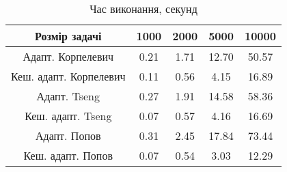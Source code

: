 \begin{table}[H]
	\centering
	\begin{tabular}{|c||c|c|c|c|}\hline
		Розмір задачі & 1000 & 2000 & 5000 & 10000 \\ \hline \hline
		Адапт. Корпелевич & 0.21 & 1.71 & 12.70 & 50.57 \\ \hline
		Кеш. адапт. Корпелевич & 0.11 & 0.56 & 4.15 & 16.89 \\ \hline
		Адапт. Tseng & 0.27 & 1.91 & 14.58 & 58.36 \\ \hline
		Кеш. адапт. Tseng & 0.07 & 0.57 & 4.16 & 16.69 \\ \hline
		Адапт. Попов & 0.31 & 2.45 & 17.84 & 73.44 \\ \hline
		Кеш. адапт. Попов & 0.07 & 0.54 & 3.03 & 12.29 \\ \hline
	\end{tabular}
	\caption{Час виконання, секунд}
\end{table}

